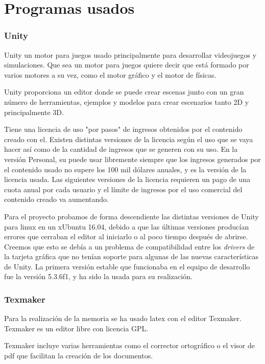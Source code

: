 
\section{Programas usados}

\subsubsection{Unity}
Unity un motor para juegos usado principalmente para desarrollar videojuegos y simulaciones. Que sea un motor para juegos quiere decir que está formado por varios motores a su vez, como el motor gráfico y el motor de físicas.

Unity proporciona un editor donde se puede crear escenas junto con un gran número de herramientas, ejemplos y modelos para crear escenarios tanto 2D y principalmente 3D.

Tiene una licencia de uso "por pasos" de ingresos obtenidos por el contenido creado con el. Existen distintas versiones de la licencia según el uso que se vaya hacer así como de la cantidad de ingresos que se generen con su uso. En la versión Personal, su puede usar libremente siempre que los ingresos generados por el contenido usado no supere los 100 mil dólares anuales, y es la versión de la licencia usada. Las siguientes versiones de la licencia requieren un pago de una cuota anual por cada usuario y el límite de ingresos por el uso comercial del contenido creado va aumentando.

Para el proyecto probamos de forma descendiente las distintas versiones de Unity para linux en un xUbuntu 16.04, debido a que las últimas versiones producían errores que cerraban el editor al iniciarlo o al poco tiempo después de abrirse. Creemos que esto se debía a un problema de compatibilidad entre los \textit{drivers} de la tarjeta gráfica que no tenían soporte para algunas de las nuevas características de Unity. La primera versión estable que funcionaba en el equipo de desarrollo fue la versión 5.3.6f1, y ha sido la usada para su realización.

\subsubsection{Texmaker}
Para la realización de la memoria se ha usado latex con el editor Texmaker.
Texmaker es un editor libre con licencia GPL.

Texmaker incluye varias herramientas como el corrector ortográfico o el visor de pdf que facilitan la creación de los documentos.


